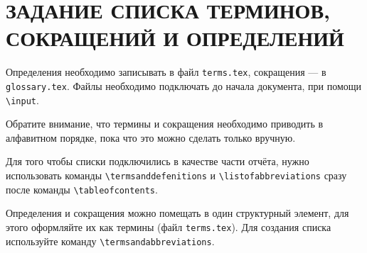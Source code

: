 \section{ЗАДАНИЕ СПИСКА ТЕРМИНОВ, СОКРАЩЕНИЙ И ОПРЕДЕЛЕНИЙ}

Определения необходимо записывать в файл \texttt{terms.tex}, сокращения --- в \texttt{glossary.tex}.
Файлы необходимо подключать до начала документа, при помощи \texttt{\textbackslash input}.

Обратите внимание, что термины и сокращения необходимо приводить в алфавитном порядке, пока что это можно сделать только вручную.

Для того чтобы списки подключились в качестве части отчёта, 
нужно использовать команды \texttt{\textbackslash termsanddefenitions} и \texttt{\textbackslash listofabbreviations} 
сразу после команды \texttt{\textbackslash tableofcontents}.

Определения и сокращения можно помещать в один структурный элемент, для этого оформляйте их как термины (файл \texttt{terms.tex}). Для создания списка используйте команду \texttt{\textbackslash termsandabbreviations}.
